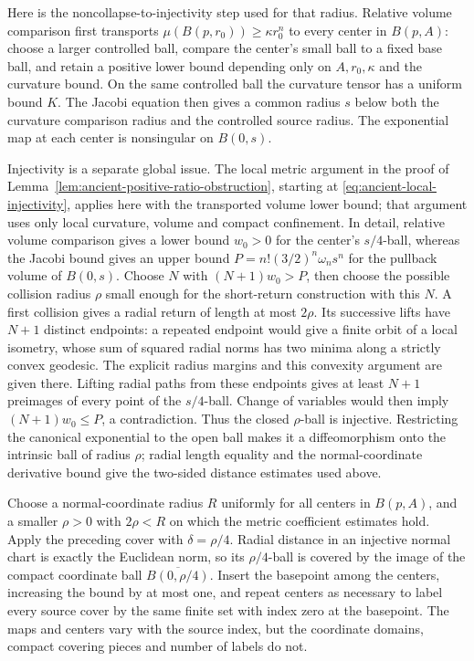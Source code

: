 Here is the noncollapse-to-injectivity step used for that radius.
Relative volume comparison first transports
$\mu(B(p,r_0))\geq\kappa r_0^n$ to every center in $B(p,A)$:
choose a larger controlled ball, compare the center's small ball to a
fixed base ball, and retain a positive lower bound depending only on
$A,r_0,\kappa$ and the curvature bound.  On the same controlled ball
the curvature tensor has a uniform bound $K$.  The Jacobi equation
then gives a common radius $s$ below both the curvature comparison
radius and the controlled source radius.  The exponential map at each
center is nonsingular on $B(0,s)$.

Injectivity is a separate global issue.  The local metric argument
in the proof of Lemma~\ref{lem:ancient-positive-ratio-obstruction},
starting at \eqref{eq:ancient-local-injectivity}, applies here with
the transported volume lower bound; that argument uses only local
curvature, volume and compact confinement.  In detail, relative volume
comparison gives a lower bound $w_0>0$ for the center's $s/4$-ball,
whereas the Jacobi bound gives an upper bound
$P=n!(3/2)^n\omega_ns^n$ for the pullback volume of $B(0,s)$.
Choose $N$ with $(N+1)w_0>P$, then choose the possible collision
radius $\rho$ small enough for the short-return construction with
this $N$.  A first collision gives a radial return of length at most
$2\rho$.  Its successive lifts have $N+1$ distinct endpoints:
a repeated endpoint would give a finite orbit of a local isometry,
whose sum of squared radial norms has two minima along a strictly
convex geodesic.  The explicit radius margins and this convexity
argument are given there.  Lifting radial paths from these endpoints
gives at least $N+1$ preimages of every point of the $s/4$-ball.
Change of variables would then imply $(N+1)w_0\leq P$, a
contradiction.  Thus the closed $\rho$-ball is injective.
Restricting the canonical exponential to the open
ball makes it a diffeomorphism onto the intrinsic ball of radius
$\rho$; radial length equality and the normal-coordinate derivative
bound give the two-sided distance estimates used above.

Choose a normal-coordinate radius $R$ uniformly for all centers in
$B(p,A)$, and a smaller $\rho>0$ with $2\rho<R$ on which the metric
coefficient estimates hold.  Apply the preceding cover with
$\delta=\rho/4$.  Radial distance in an injective normal chart is
exactly the Euclidean norm, so its $\rho/4$-ball is covered by the
image of the compact coordinate ball $\overline{B(0,\rho/4)}$.
Insert the basepoint among the centers, increasing the bound by at
most one, and repeat centers as necessary to label every source cover
by the same finite set with index zero at the basepoint.  The maps
and centers vary with the source index, but the coordinate domains,
compact covering pieces and number of labels do not.

